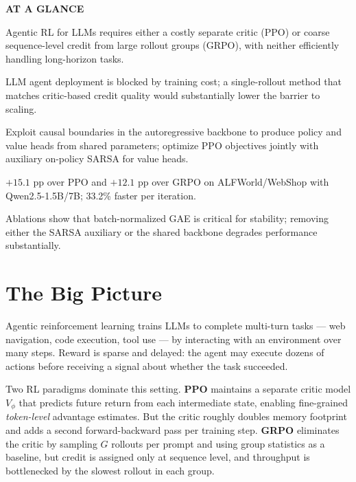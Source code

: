 \documentclass[10pt,twocolumn]{article}
\begin{document}
\begin{mdframed}[backgroundcolor=boxgray,linecolor=rulered,linewidth=1pt,
    innerleftmargin=6pt,innerrightmargin=6pt,
    innertopmargin=6pt,innerbottommargin=6pt]
\textbf{\small AT A GLANCE}\par\vspace{4pt}
\begin{description}[leftmargin=0pt,labelsep=4pt,itemsep=2pt,parsep=0pt,
    font=\small\bfseries]
  \item[Problem:] Agentic RL for LLMs requires either a costly separate
    critic (PPO) or coarse sequence-level credit from large rollout
    groups (GRPO), with neither efficiently handling long-horizon tasks.
  \item[Why it matters:] LLM agent deployment is blocked by training cost;
    a single-rollout method that matches critic-based credit quality would
    substantially lower the barrier to scaling.
  \item[Method:] Exploit causal boundaries in the autoregressive backbone
    to produce policy and value heads from shared parameters; optimize PPO
    objectives jointly with auxiliary on-policy SARSA for value heads.
  \item[Result:] $+15.1$ pp over PPO and $+12.1$ pp over GRPO on
    ALFWorld/WebShop with Qwen2.5-1.5B/7B; 33.2\% faster per iteration.
  \item[Evidence:] Ablations show that batch-normalized GAE is critical
    for stability; removing either the SARSA auxiliary or the shared
    backbone degrades performance substantially.
\end{description}
\end{mdframed}

\section{The Big Picture}

Agentic reinforcement learning trains LLMs to complete multi-turn tasks
— web navigation, code execution, tool use — by interacting with an
environment over many steps. Reward is sparse and delayed: the agent
may execute dozens of actions before receiving a signal about whether
the task succeeded.

Two RL paradigms dominate this setting. \textbf{PPO} maintains a
separate critic model $V_\phi$ that predicts future return from each
intermediate state, enabling fine-grained \emph{token-level} advantage
estimates. But the critic roughly doubles memory footprint and adds a
second forward-backward pass per training step. \textbf{GRPO} eliminates
the critic by sampling $G$ rollouts per prompt and using group statistics
as a baseline, but credit is assigned only at sequence level, and
throughput is bottlenecked by the slowest rollout in each group.
\end{document}
